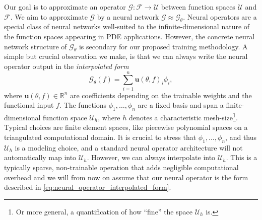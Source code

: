 \documentclass{article} %
\begin{document}
Our goal is to approximate an operator $\mathcal G:\mathcal F \to \mathcal U$ between function spaces $\mathcal U$ and $\mathcal F$. We aim to approximate $\mathcal G$ by a neural network $\mathcal G \approx \mathcal G_\theta$. Neural operators are a special class of neural networks well-suited to the infinite-dimensional nature of the function spaces appearing in PDE applications. However, the concrete neural network structure of $\mathcal G_\theta$ is secondary for our proposed training methodology. A simple but crucial observation we make, is that we can always write the neural operator output in the \emph{interpolated form} %
\begin{equation}\label{eq:neural_operator_interpolated_form}
   \mathcal G_\theta(f) = \sum_{i=1}^n \mathbf{u}(\theta, f)_i \phi_i,
\end{equation}
where $\mathbf u(\theta, f)\in\mathbb R^n$ are coefficients depending on the trainable weights and the functional input $f$. The functions $\phi_1, \dots,\phi_n$ are a fixed basis and span a finite-dimensional function space $\mathcal U_h$, where $h$ denotes a characteristic mesh-size\footnote{Or more general, a quantification of how ``fine'' the space $\mathcal U_h$ is.}. Typical choices are finite element spaces, like piecewise polynomial spaces on a triangulated computational domain. It is crucial to stress that $\phi_1,\dots, \phi_n$, and thus $\mathcal U_h$ is a modeling choice, and a standard neural operator architecture will not automatically map into $\mathcal U_h$. However, we can always interpolate into $\mathcal U_h$. This is a typically sparse, non-trainable operation that adds negligible computational overhead and we will from now on assume that our neural operator is the form described in \eqref{eq:neural_operator_interpolated_form}.
\end{document}

